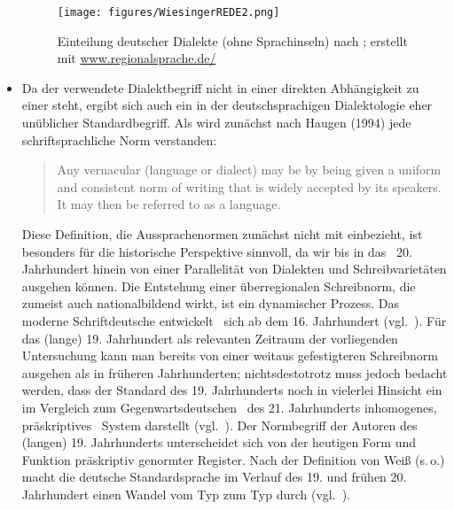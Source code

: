 \begin{itemize}
\begin{figure}[h!]
 \farbgrafik
\centering

\texttt{[image: figures/WiesingerREDE2.png]}
		\caption{\label{kartedtdialekte}Einteilung deutscher Dialekte (ohne Sprachinseln) nach \parencite[830, Karte 47.4]{Wiesinger1983a}; erstellt mit \url{www.regionalsprache.de/}}
	\end{figure}



\item Da der verwendete Dialektbegriff nicht in einer direkten Abhängigkeit zu einer  steht, ergibt sich auch ein in der deutschsprachigen Dialektologie eher unüblicher Standardbegriff. Als  wird zunächst nach Haugen (1994) jede schriftsprachliche Norm verstanden:

\begin{quote}
Any vernacular (language or dialect) may be  by being given a uniform and consistent norm of writing that is widely accepted by its speakers. It may then be referred to as a  language. \parencite[4340]{Haugen1994}
\end{quote}

 
Diese Definition, die Aussprachenormen zunächst nicht mit einbezieht, ist besonders für die historische Perspektive sinnvoll, da wir bis in das \,%
20. Jahrhundert hinein von einer Parallelität von Dialekten und Schreibvarietäten ausgehen können. Die Entstehung einer überregionalen Schreibnorm, die zumeist auch nationalbildend wirkt, ist ein dynamischer Prozess. Das moderne Schriftdeutsche entwickelt \,%
sich ab dem 16. Jahrhundert (vgl.\, \citealt{Besch1988,Besch2003,Mattheier2000}). Für das (lange) 19. Jahrhundert als relevanten Zeitraum der vorliegenden Untersuchung kann man bereits von einer weitaus gefestigteren Schreibnorm ausgehen als in früheren Jahrhunderten; nichtsdestotrotz muss jedoch bedacht werden, dass der Standard des 19. Jahrhunderts noch in vielerlei Hinsicht ein im Vergleich zum Gegenwartsdeutschen \,%
des 21. Jahrhunderts inhomogenes, präskriptives \,%
System darstellt (vgl.\, \citealt{Elspass2005a,Elspass2005}). Der Normbegriff der Autoren des (langen) 19. Jahrhunderts unterscheidet sich von der heutigen Form und Funktion präskriptiv genormter Register. Nach der Definition von Weiß (s.\,o.) macht die deutsche Standardsprache im Verlauf des 19. und frühen 20. Jahrhundert einen Wandel vom Typ  zum Typ  durch (vgl.\, \citealt[12f]{Weiss1998}). 



\end{itemize}
